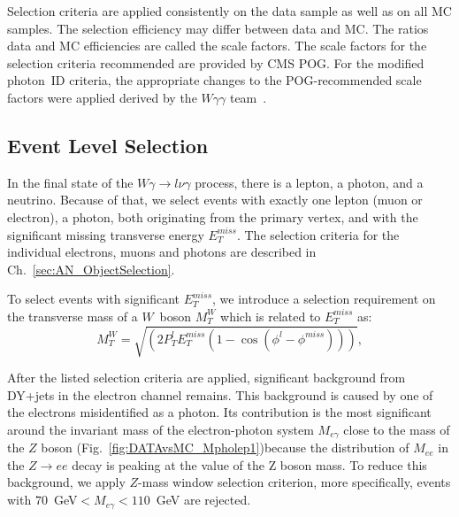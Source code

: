 Selection criteria are applied consistently on the data sample as well as on all MC samples. The selection efficiency may differ between data and MC. The ratios data and MC efficiencies are called the scale factors. The scale factors for the selection criteria recommended are provided by CMS POG. For the modified photon~ID criteria, the appropriate changes to the POG-recommended scale factors were applied derived by the $W\gamma\gamma$ team~\cite{ref_Wgg8TeV}.

\subsection{Event Level Selection}
\label{sec:AN_Selection_EventLevel}

In the final state of the $W\gamma\rightarrow l\nu\gamma$ process, there is a lepton, a photon, and a neutrino. Because of that, we select events with exactly one lepton (muon or electron), a photon, both originating from the primary vertex, and with the significant missing transverse energy $E_T^{miss}$. The selection criteria for the individual electrons, muons and photons are described in Ch.~\ref{sec:AN_ObjectSelection}.

To select events with significant $E_T^{miss}$, we introduce a selection requirement on the transverse mass of a $W$~boson $M_T^W$ which is related to $E_T^{miss}$ as: 
\begin{equation}
M_T^W=\sqrt{(2  P_T^{l}  E_T^{miss}  (1-\cos{(\phi^{l}-\phi^{miss})}))},
\end{equation}

After the listed selection criteria are applied, significant background from DY+jets in the electron channel remains. This background is caused by one of the electrons misidentified as a photon. Its contribution is the most significant around the invariant mass of the electron-photon system $M_{e\gamma}$ close to the mass of the $Z$ boson (Fig.~\ref{fig:DATAvsMC_Mpholep1})because the distribution of $M_{ee}$ in the $Z\rightarrow e e$ decay is peaking at the value of the Z boson mass. To reduce this background, we apply $Z$-mass window selection criterion, more specifically, events with $70$~GeV$<M_{e\gamma}<110$~GeV are rejected. 

